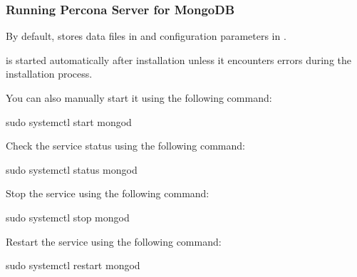 \documentclass[letterpaper,10pt,english]{sphinxmanual}
\begin{document}
\subsubsection{Running Percona Server for MongoDB}
\label{\detokenize{install/apt:running-percona-server-for-mongodb}}
\sphinxAtStartPar
By default,  stores data files in 
and configuration parameters in .

\sphinxAtStartPar
{}

\sphinxAtStartPar
{} is started automatically after installation unless it encounters errors during the installation process.

\sphinxAtStartPar
You can also manually start it using the following command:

\begin{sphinxVerbatim}[commandchars=\\\{\}]
\PYGZdl{} sudo systemctl start mongod
\end{sphinxVerbatim}

\sphinxAtStartPar
{}

\sphinxAtStartPar
Check the service status using the following command:

\begin{sphinxVerbatim}[commandchars=\\\{\}]
\PYGZdl{} sudo systemctl status mongod
\end{sphinxVerbatim}

\sphinxAtStartPar
{}

\sphinxAtStartPar
Stop the service using the following command:

\begin{sphinxVerbatim}[commandchars=\\\{\}]
\PYGZdl{} sudo systemctl stop mongod
\end{sphinxVerbatim}

\sphinxAtStartPar
{}

\sphinxAtStartPar
Restart the service using the following command:

\begin{sphinxVerbatim}[commandchars=\\\{\}]
\PYGZdl{} sudo systemctl restart mongod
\end{sphinxVerbatim}
\end{document}

